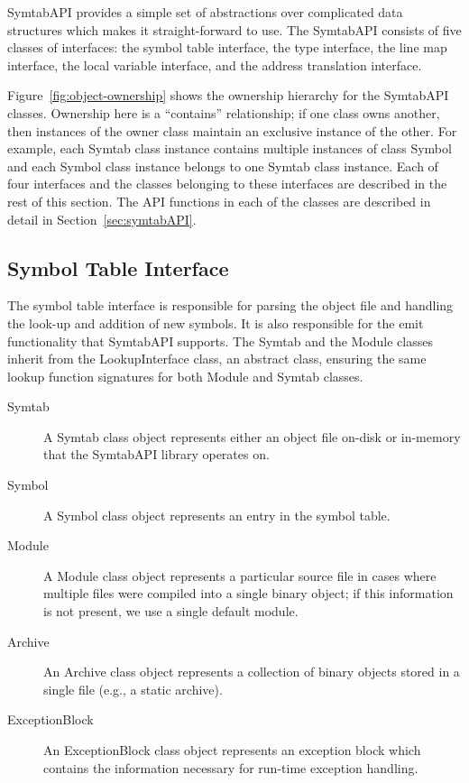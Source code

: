 SymtabAPI provides a simple set of abstractions over complicated data structures
which makes it straight-forward to use. The SymtabAPI consists of five classes of
interfaces: the symbol table interface, the type interface, the line map
interface, the local variable interface, and the address translation interface.

Figure~\ref{fig:object-ownership} shows the ownership hierarchy for the
SymtabAPI classes. Ownership here is a ``contains'' relationship; if one
class owns another, then instances of the owner class maintain an exclusive
instance of the other. For example, each Symtab class instance contains multiple
instances of class Symbol and each Symbol class instance belongs to one Symtab
class instance. Each of four interfaces and the classes belonging to these
interfaces are described in the rest of this section. The API functions in each
of the classes are described in detail in Section~\ref{sec:symtabAPI}.

\subsection{Symbol Table Interface}

The symbol table interface is responsible for parsing the object file and
handling the look-up and addition of new symbols. It is also responsible for the
emit functionality that SymtabAPI supports. The Symtab and the Module classes
inherit from the LookupInterface class, an abstract class, ensuring the same
lookup function signatures for both Module and Symtab classes.

\begin{description}
\item[Symtab] A Symtab class object represents either an object file on-disk or in-memory that the SymtabAPI library operates on.
\item[Symbol] A Symbol class object represents an entry in the symbol table.
\item[Module] A Module class object represents a particular source file in cases where multiple files were compiled into a single binary object; if this information is not present, we use a single default module.
\item[Archive] An Archive class object represents a collection of binary objects stored in a single file (e.g., a static archive).
\item[ExceptionBlock] An ExceptionBlock class object represents an exception block which contains the information necessary for run-time exception handling.
\end{description}

